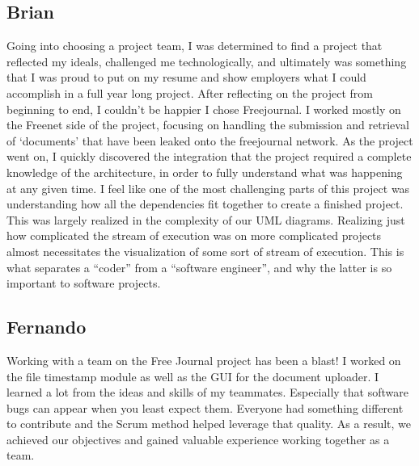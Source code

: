 \documentclass[letterpaper,10pt,oneside]{sphinxmanual}
\begin{document}
\subsection{Brian}
\label{future:brian}
Going into choosing a project team, I was determined to find a project that reflected my ideals, challenged me
technologically, and ultimately was something that I was proud to put on my resume and show employers what I
could accomplish in a full year long project. After reflecting on the project from beginning to end, I
couldn’t be happier I chose Freejournal. I worked mostly on the Freenet side of the project, focusing on
handling the submission and retrieval of ‘documents’ that have been leaked onto the freejournal network. As
the project went on, I quickly discovered the integration that the project required a complete knowledge of
the architecture, in order to fully understand what was happening at any given time. I feel like one of the
most challenging parts of this project was understanding how all the dependencies fit together to create a
finished project. This was largely realized in the complexity of our UML diagrams. Realizing just how
complicated the stream of execution was on more complicated projects almost necessitates the visualization of
some sort of stream of execution. This is what separates a “coder” from a “software engineer”, and why the
latter is so important to software projects.


\subsection{Fernando}
\label{future:fernando}
Working with a team on the Free Journal project has been a blast! I worked on the file timestamp module as
well as the GUI for the document uploader. I learned a lot from the ideas and skills of my teammates.
Especially that software bugs can appear when you least expect them. Everyone had something different to
contribute and the Scrum method helped leverage that quality. As a result, we achieved our objectives and
gained valuable experience working together as a team.
\end{document}
